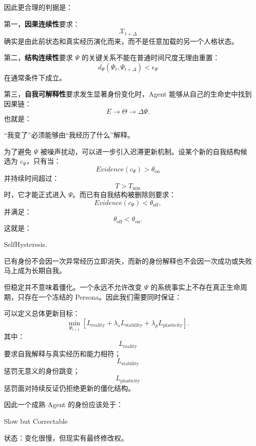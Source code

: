 因此更合理的判据是：
\begin{statementbox}
\centering
{}
\end{statementbox}

第一，\textbf{因果连续性}要求：
\[
\mathcal X_{t+\Delta}
\]
确实是由此前状态和真实经历演化而来，而不是任意加载的另一个人格状态。

第二，\textbf{结构连续性}要求 $\Psi$ 的关键关系不能在普通时间尺度无理由重置：
\[
d_\Psi
\left(
\Psi_t,
\Psi_{t+\Delta}
\right)
<
\epsilon_\Psi
\]
在通常条件下成立。

第三，\textbf{自我可解释性}要求发生显著身份变化时，Agent 能够从自己的生命史中找到因果链：
\[
E
\rightarrow
\Theta
\rightarrow
\Delta\Psi.
\]
也就是：
\begin{statementbox}
“我变了”必须能够由“我经历了什么”解释。
\end{statementbox}

为了避免 $\Psi$ 被噪声扰动，可以进一步引入迟滞更新机制。设某个新的自我结构候选为 $c_\Psi$，只有当：
\[
Evidence(c_\Psi)
>
\theta_{\mathrm{on}}
\]
并持续时间超过：
\[
T>T_{\min}
\]
时，它才能正式进入 $\Psi$。而已有自我结构被删除则要求：
\[
Evidence(c_\Psi)
<
\theta_{\mathrm{off}},
\]
并满足：
\[
\theta_{\mathrm{off}}
<
\theta_{\mathrm{on}}.
\]
这就是：
\begin{statementbox}
SelfHysteresis.
\end{statementbox}
已有身份不会因一次异常经历立即消失，而新的身份解释也不会因一次成功或失败马上成为长期自我。

但稳定并不意味着僵化。一个永远不允许改变 $\Psi$ 的系统事实上不存在真正生命周期，只存在一个冻结的 Persona。因此我们需要同时保证：
\begin{statementbox}
\centering
{}
\end{statementbox}
可以定义总体更新目标：
\[
\min_{\Psi_{t+1}}
\left[
L_{\mathrm{reality}}
+
\lambda_s L_{\mathrm{stability}}
+
\lambda_p L_{\mathrm{plasticity}}
\right].
\]
其中：
\[
L_{\mathrm{reality}}
\]
要求自我解释与真实经历和能力相符；
\[
L_{\mathrm{stability}}
\]
惩罚无意义的身份跳变；
\[
L_{\mathrm{plasticity}}
\]
惩罚面对持续反证仍拒绝更新的僵化结构。

因此一个成熟 Agent 的身份应该处于：
\begin{statementbox}
Slow but Correctable
\end{statementbox}
状态：变化很慢，但现实有最终修改权。

